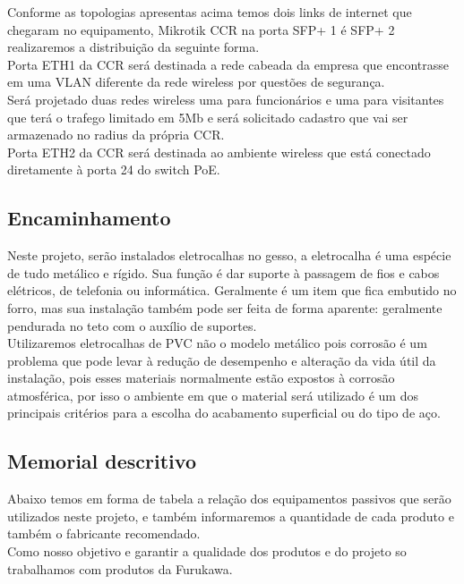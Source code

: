 \documentclass[	DIV=calc,%
							paper=a4,%
							fontsize=12pt,%
							onecolumn]{scrartcl}	 					%
\begin{document}
Conforme as topologias apresentas acima temos dois links de internet que chegaram no equipamento, Mikrotik CCR na porta SFP+ 1 é SFP+ 2 realizaremos a distribuição da seguinte forma.
\\

Porta ETH1 da CCR será destinada a rede cabeada da empresa que encontrasse em uma VLAN diferente da rede wireless por questões de segurança.
\\
 
Será projetado duas redes wireless uma para funcionários e uma para visitantes que terá o trafego limitado em 5Mb e será solicitado cadastro que vai ser armazenado no radius da própria CCR.
\\

Porta ETH2 da CCR será destinada ao ambiente wireless que está conectado diretamente à porta 24 do switch PoE.  

\subsection{Encaminhamento}
Neste projeto, serão instalados eletrocalhas no gesso, a eletrocalha é uma espécie de tudo metálico e rígido. Sua função é dar suporte à passagem de fios e cabos elétricos, de telefonia ou informática. Geralmente é um item que fica embutido no forro, mas sua instalação também pode ser feita de forma aparente: geralmente pendurada no teto com o auxílio de suportes.
\\

Utilizaremos eletrocalhas de PVC não o modelo metálico pois corrosão é um problema que pode levar à redução de desempenho e alteração da vida útil da instalação, pois esses materiais normalmente estão expostos à corrosão atmosférica, por isso o ambiente em que o material será utilizado é um dos principais critérios para a escolha do acabamento superficial ou do tipo de aço.

\subsection{Memorial descritivo}

		Abaixo temos em forma de tabela a relação dos equipamentos passivos que serão utilizados neste projeto, e também informaremos a quantidade de cada produto e também o fabricante recomendado.
\\

Como nosso objetivo e garantir a qualidade dos produtos e do projeto so trabalhamos com produtos da Furukawa.
\end{document}
